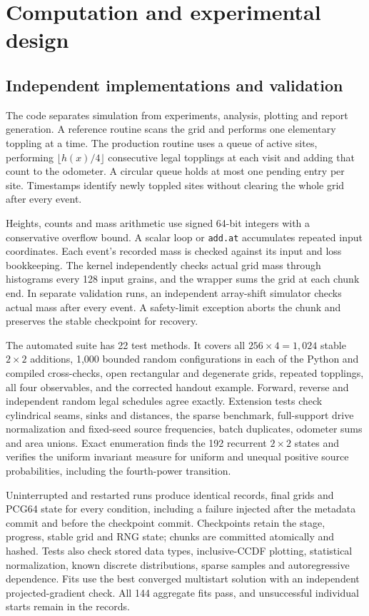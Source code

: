 \chapter{Computation and experimental design}\label{sec:methods}
\section{Independent implementations and validation}\label{sec:validation}
The code separates simulation from experiments, analysis, plotting and report generation. A reference routine scans the grid and performs one elementary toppling at a time. The production routine uses a queue of active sites, performing $\lfloor h(x)/4\rfloor$ consecutive legal topplings at each visit and adding that count to the odometer. A circular queue holds at most one pending entry per site. Timestamps identify newly toppled sites without clearing the whole grid after every event.

Heights, counts and mass arithmetic use signed 64-bit integers with a conservative overflow bound. A scalar loop or \texttt{add.at} accumulates repeated input coordinates. Each event's recorded mass is checked against its input and loss bookkeeping. The kernel independently checks actual grid mass through histograms every 128 input grains, and the wrapper sums the grid at each chunk end. In separate validation runs, an independent array-shift simulator checks actual mass after every event. A safety-limit exception aborts the chunk and preserves the stable checkpoint for recovery.

The automated suite has 22 test methods. It covers all $256\times4=1,024$ stable $2\times2$ additions, 1,000 bounded random configurations in each of the Python and compiled cross-checks, open rectangular and degenerate grids, repeated topplings, all four observables, and the corrected handout example. Forward, reverse and independent random legal schedules agree exactly. Extension tests check cylindrical seams, sinks and distances, the sparse benchmark, full-support drive normalization and fixed-seed source frequencies, batch duplicates, odometer sums and area unions. Exact enumeration finds the 192 recurrent $2\times2$ states and verifies the uniform invariant measure for uniform and unequal positive source probabilities, including the fourth-power transition.

Uninterrupted and restarted runs produce identical records, final grids and PCG64 state for every condition, including a failure injected after the metadata commit and before the checkpoint commit. Checkpoints retain the stage, progress, stable grid and RNG state; chunks are committed atomically and hashed. Tests also check stored data types, inclusive-CCDF plotting, statistical normalization, known discrete distributions, sparse samples and autoregressive dependence. Fits use the best converged multistart solution with an independent projected-gradient check. All 144 aggregate fits pass, and unsuccessful individual starts remain in the records.

